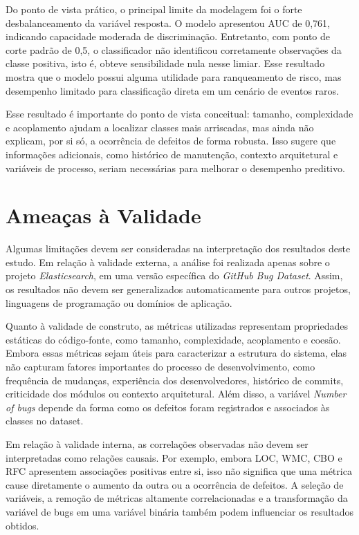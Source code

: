 \documentclass[12pt]{article}
\begin{document}
Do ponto de vista prático, o principal limite da modelagem foi o forte desbalanceamento da variável resposta. O modelo apresentou AUC de 0{,}761, indicando capacidade moderada de discriminação. Entretanto, com ponto de corte padrão de 0{,}5, o classificador não identificou corretamente observações da classe positiva, isto é, obteve sensibilidade nula nesse limiar. Esse resultado mostra que o modelo possui alguma utilidade para ranqueamento de risco, mas desempenho limitado para classificação direta em um cenário de eventos raros.

Esse resultado é importante do ponto de vista conceitual: tamanho, complexidade e acoplamento ajudam a localizar classes mais arriscadas, mas ainda não explicam, por si só, a ocorrência de defeitos de forma robusta. Isso sugere que informações adicionais, como histórico de manutenção, contexto arquitetural e variáveis de processo, seriam necessárias para melhorar o desempenho preditivo.

\section{Ameaças à Validade}

Algumas limitações devem ser consideradas na interpretação dos resultados deste estudo. Em relação à validade externa, a análise foi realizada apenas sobre o projeto \textit{Elasticsearch}, em uma versão específica do \textit{GitHub Bug Dataset}. Assim, os resultados não devem ser generalizados automaticamente para outros projetos, linguagens de programação ou domínios de aplicação.

Quanto à validade de construto, as métricas utilizadas representam propriedades estáticas do código-fonte, como tamanho, complexidade, acoplamento e coesão. Embora essas métricas sejam úteis para caracterizar a estrutura do sistema, elas não capturam fatores importantes do processo de desenvolvimento, como frequência de mudanças, experiência dos desenvolvedores, histórico de commits, criticidade dos módulos ou contexto arquitetural. Além disso, a variável \textit{Number of bugs} depende da forma como os defeitos foram registrados e associados às classes no dataset.

Em relação à validade interna, as correlações observadas não devem ser interpretadas como relações causais. Por exemplo, embora LOC, WMC, CBO e RFC apresentem associações positivas entre si, isso não significa que uma métrica cause diretamente o aumento da outra ou a ocorrência de defeitos. A seleção de variáveis, a remoção de métricas altamente correlacionadas e a transformação da variável de bugs em uma variável binária também podem influenciar os resultados obtidos.
\end{document}

